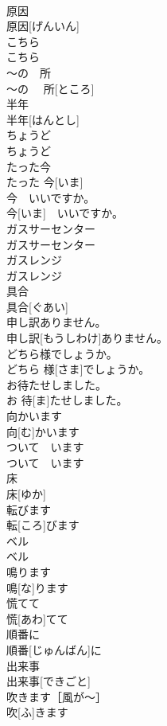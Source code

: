 \documentclass[8pt]{extreport}
\begin{document}
\begin{CJK}{UTF8}{min}
\\	原因	
\\	原因[げんいん]	
\\	こちら	
\\	こちら	
\\	〜の　所	
\\	〜の　 所[ところ]	
\\	半年	
\\	半年[はんとし]	
\\	ちょうど	
\\	ちょうど	
\\	たった今	
\\	たった 今[いま]	
\\	今　いいですか。	
\\	今[いま]　いいですか。	
\\	ガスサーセンター	
\\	ガスサーセンター	
\\	ガスレンジ	
\\	ガスレンジ	
\\	具合	
\\	具合[ぐあい]	
\\	申し訳ありません。	
\\	申し訳[もうしわけ]ありません。	
\\	どちら様でしょうか。	
\\	どちら 様[さま]でしょうか。	
\\	お待たせしました。	
\\	お 待[ま]たせしました。	
\\	向かいます	
\\	向[む]かいます	
\\	ついて　います	
\\	ついて　います	
\\	床	
\\	床[ゆか]	
\\	転びます	
\\	転[ころ]びます	
\\	ベル	
\\	ベル	
\\	鳴ります	
\\	鳴[な]ります	
\\	慌てて	
\\	慌[あわ]てて	
\\	順番に	
\\	順番[じゅんばん]に	
\\	出来事	
\\	出来事[できごと]	
\\	吹きます［風が〜］	
\\	吹[ふ]きます

\end{CJK}
\end{document}
